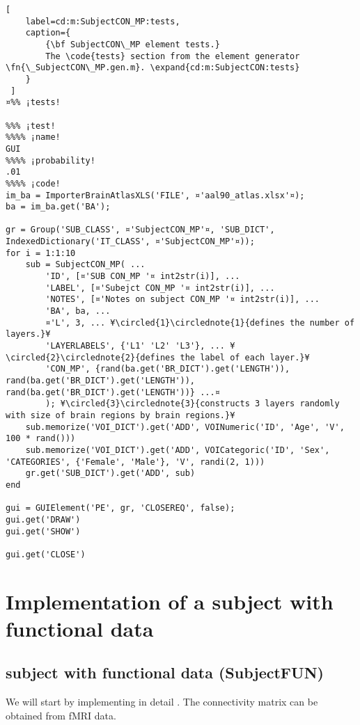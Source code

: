 \documentclass{tufte-handout}
\begin{document}
\begin{lstlisting}[
	label=cd:m:SubjectCON_MP:tests,
	caption={
		{\bf SubjectCON\_MP element tests.}
		The \code{tests} section from the element generator \fn{\_SubjectCON\_MP.gen.m}. \expand{cd:m:SubjectCON:tests}
	}
 ]
¤%% ¡tests!

%%% ¡test!
%%%% ¡name!
GUI
%%%% ¡probability!
.01
%%%% ¡code!
im_ba = ImporterBrainAtlasXLS('FILE', ¤'aal90_atlas.xlsx'¤);
ba = im_ba.get('BA');

gr = Group('SUB_CLASS', ¤'SubjectCON_MP'¤, 'SUB_DICT', IndexedDictionary('IT_CLASS', ¤'SubjectCON_MP'¤));
for i = 1:1:10 
    sub = SubjectCON_MP( ...
        'ID', [¤'SUB CON_MP '¤ int2str(i)], ...
        'LABEL', [¤'Subejct CON_MP '¤ int2str(i)], ...
        'NOTES', [¤'Notes on subject CON_MP '¤ int2str(i)], ...
        'BA', ba, ...
        ¤'L', 3, ... ¥\circled{1}\circlednote{1}{defines the number of layers.}¥
        'LAYERLABELS', {'L1' 'L2' 'L3'}, ... ¥\circled{2}\circlednote{2}{defines the label of each layer.}¥
        'CON_MP', {rand(ba.get('BR_DICT').get('LENGTH')), rand(ba.get('BR_DICT').get('LENGTH')), rand(ba.get('BR_DICT').get('LENGTH'))} ...¤
        ); ¥\circled{3}\circlednote{3}{constructs 3 layers randomly with size of brain regions by brain regions.}¥
    sub.memorize('VOI_DICT').get('ADD', VOINumeric('ID', 'Age', 'V', 100 * rand()))
    sub.memorize('VOI_DICT').get('ADD', VOICategoric('ID', 'Sex', 'CATEGORIES', {'Female', 'Male'}, 'V', randi(2, 1)))
    gr.get('SUB_DICT').get('ADD', sub)
end

gui = GUIElement('PE', gr, 'CLOSEREQ', false);
gui.get('DRAW')
gui.get('SHOW')

gui.get('CLOSE')
\end{lstlisting}

\clearpage
\section{Implementation of a subject with functional data}
\subsection{subject with functional data (SubjectFUN)}

We will start by implementing in detail . The connectivity matrix can be obtained from fMRI data.
\end{document}
